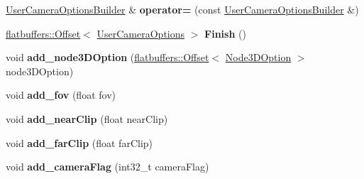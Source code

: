 \begin{DoxyCompactItemize}
\item 
\mbox{\label{structflatbuffers_1_1UserCameraOptionsBuilder_a2e52b50080795b2d14309e88c65b00f8}} 
\hyperlink{structflatbuffers_1_1UserCameraOptionsBuilder}{User\+Camera\+Options\+Builder} \& {\bfseries operator=} (const \hyperlink{structflatbuffers_1_1UserCameraOptionsBuilder}{User\+Camera\+Options\+Builder} \&)
\item 
\mbox{\label{structflatbuffers_1_1UserCameraOptionsBuilder_ac3409ebba3c2e7e55b181e2cae9dc7cf}} 
\hyperlink{structflatbuffers_1_1Offset}{flatbuffers\+::\+Offset}$<$ \hyperlink{structflatbuffers_1_1UserCameraOptions}{User\+Camera\+Options} $>$ {\bfseries Finish} ()
\item 
\mbox{\label{structflatbuffers_1_1UserCameraOptionsBuilder_a8270c8212f542be80d44b94b3aab02d8}} 
void {\bfseries add\+\_\+node3\+D\+Option} (\hyperlink{structflatbuffers_1_1Offset}{flatbuffers\+::\+Offset}$<$ \hyperlink{structflatbuffers_1_1Node3DOption}{Node3\+D\+Option} $>$ node3\+D\+Option)
\item 
\mbox{\label{structflatbuffers_1_1UserCameraOptionsBuilder_acf7edbe2c34aad60b5c3a6222a27cde8}} 
void {\bfseries add\+\_\+fov} (float fov)
\item 
\mbox{\label{structflatbuffers_1_1UserCameraOptionsBuilder_a0f044ea1d36544e66bd1d6c037e9b5ae}} 
void {\bfseries add\+\_\+near\+Clip} (float near\+Clip)
\item 
\mbox{\label{structflatbuffers_1_1UserCameraOptionsBuilder_a6d2f9634e2c559d0fdf1868872ea83b2}} 
void {\bfseries add\+\_\+far\+Clip} (float far\+Clip)
\item 
\mbox{\label{structflatbuffers_1_1UserCameraOptionsBuilder_a1b833165a8a036fdfd9de3aa967b5785}} 
void {\bfseries add\+\_\+camera\+Flag} (int32\+\_\+t camera\+Flag)
\item 
\mbox{\label{structflatbuffers_1_1UserCameraOptionsBuilder_ac35c9b5620b83f884d4d4084217eaa39}} 

\end{DoxyCompactItemize}
